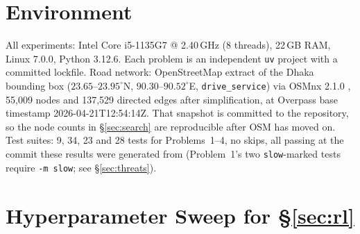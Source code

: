 \documentclass[11pt]{article}
\begin{document}
\appendix

\section{Environment}
\label{app:env}

All experiments: Intel Core i5-1135G7 @ 2.40\,GHz (8 threads), 22\,GB
RAM, Linux 7.0.0, Python 3.12.6. Each problem is an independent \texttt{uv} project with a
committed lockfile. Road network: OpenStreetMap extract of the Dhaka bounding box
($23.65$--$23.95^{\circ}$N, $90.30$--$90.52^{\circ}$E, \texttt{drive\_service}) via OSMnx 2.1.0
\citep{boeing2017osmnx}, 55,009 nodes and 137,529 directed edges after simplification, at Overpass
base timestamp 2026-04-21T12:54:14Z. That snapshot is committed to the repository, so the node
counts in \S\ref{sec:search} are reproducible after OSM has moved on.
Test suites: 9, 34, 23 and 28 tests for Problems~1--4, no skips, all passing at the commit these
results were generated from (Problem~1's two \texttt{slow}-marked tests require
\texttt{-m slow}; see \S\ref{sec:threats}).

\section{Hyperparameter Sweep for \S\ref{sec:rl}}
\label{app:sweep}


\end{document}
